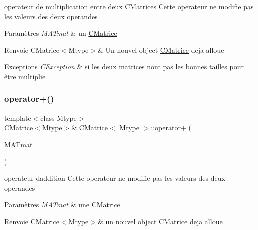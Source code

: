 operateur de multiplication entre deux C\+Matrices Cette operateur ne modifie pas les valeurs des deux operandes 


\begin{DoxyParams}{Paramètres}
{\em M\+A\+Tmat} & un \hyperlink{classCMatrice}{C\+Matrice} \\
\hline
\end{DoxyParams}
\begin{DoxyReturn}{Renvoie}
C\+Matrice$<$\+Mtype$>$\& Un nouvel object \hyperlink{classCMatrice}{C\+Matrice} deja alloue 
\end{DoxyReturn}

\begin{DoxyExceptions}{Exceptions}
{\em \hyperlink{classCException}{C\+Exception}} & si les deux matrices n\textquotesingle{}ont pas les bonnes tailles pour être multiplie \\
\hline
\end{DoxyExceptions}
\mbox{\label{classCMatrice_a85edbf29e17d10ba39ef7a0c7648da88}} 
\subsubsection{\texorpdfstring{operator+()}{operator+()}}
{\footnotesize\ttfamily template$<$class Mtype$>$ \\
\hyperlink{classCMatrice}{C\+Matrice}$<$Mtype$>$\& \hyperlink{classCMatrice}{C\+Matrice}$<$ Mtype $>$\+::operator+ (\begin{DoxyParamCaption}\item[{\hyperlink{classCMatrice}{C\+Matrice}$<$ Mtype $>$ \&}]{M\+A\+Tmat }\end{DoxyParamCaption})\hspace{0.3cm}{\ttfamily [inline]}}



operateur d\textquotesingle{}addition Cette operateur ne modifie pas les valeurs des deux operandes 


\begin{DoxyParams}{Paramètres}
{\em M\+A\+Tmat} & une \hyperlink{classCMatrice}{C\+Matrice} \\
\hline
\end{DoxyParams}
\begin{DoxyReturn}{Renvoie}
C\+Matrice$<$\+Mtype$>$\& un nouvel object \hyperlink{classCMatrice}{C\+Matrice} deja alloue 
\end{DoxyReturn}

